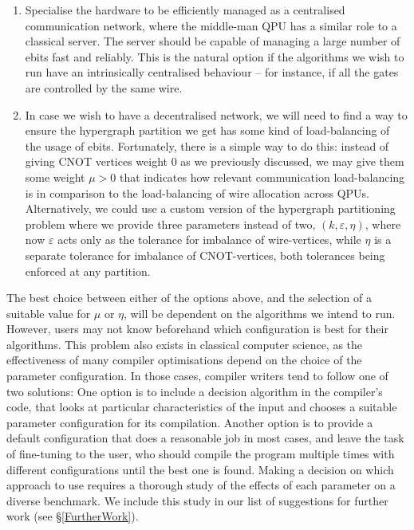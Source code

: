 \begin{enumerate}
\item Specialise the hardware to be efficiently managed as a centralised communication network, where the middle-man QPU has a similar role to a classical server. The server should be capable of managing a large number of ebits fast and reliably. This is the natural option if the algorithms we wish to run have an intrinsically centralised behaviour -- for instance, if all the gates are controlled by the same wire.

\item In case we wish to have a decentralised network, we will need to find a way to ensure the hypergraph partition we get has some kind of load-balancing of the usage of ebits. Fortunately, there is a simple way to do this: instead of giving CNOT vertices weight \(0\) as we previously discussed, we may give them some weight \(\mu > 0\) that indicates how relevant communication load-balancing is in comparison to the load-balancing of wire allocation across QPUs. Alternatively, we could use a custom version of the hypergraph partitioning problem where we provide three parameters instead of two, \((k,\varepsilon,\eta)\), where now \(\varepsilon\) acts only as the tolerance for imbalance of wire-vertices, while \(\eta\) is a separate tolerance for imbalance of CNOT-vertices, both tolerances being enforced at any partition.
\end{enumerate}

The best choice between either of the options above, and the selection of a suitable value for \(\mu\) or \(\eta\), will be dependent on the algorithms we intend to run. However, users may not know beforehand which configuration is best for their algorithms. This problem also exists in classical computer science, as the effectiveness of many compiler optimisations depend on the choice of the parameter configuration. In those cases, compiler writers tend to follow one of two solutions: One option is to include a decision algorithm in the compiler's code, that looks at particular characteristics of the input and chooses a suitable parameter configuration for its compilation. Another option is to provide a default configuration that does a reasonable job in most cases, and leave the task of fine-tuning to the user, who should compile the program multiple times with different configurations until the best one is found. Making a decision on which approach to use requires a thorough study of the effects of each parameter on a diverse benchmark. We include this study in our list of suggestions for further work (see \S\ref{FurtherWork}).

